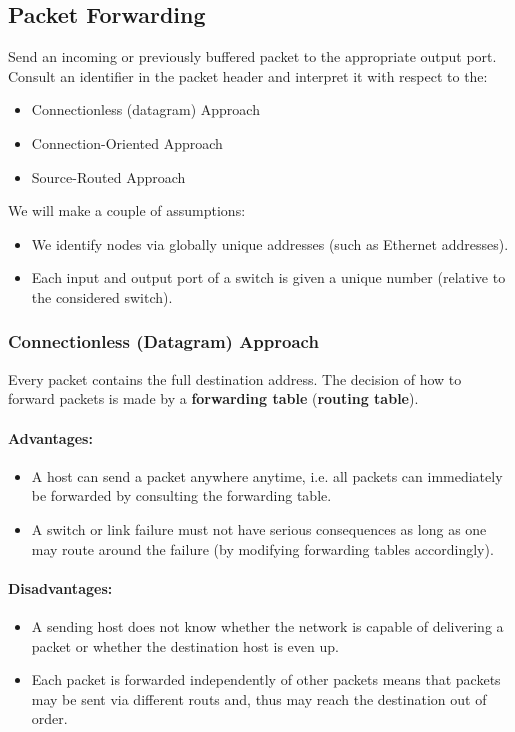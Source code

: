 \documentclass{article}%
\begin{document}
\subsection{Packet Forwarding}
\label{sec:org8fb40f2}
Send an incoming or previously buffered packet to the appropriate output port.
Consult an identifier in the packet header and interpret it with respect to the:
\begin{itemize}
\item Connectionless (datagram) Approach
\item Connection-Oriented Approach
\item Source-Routed Approach
\end{itemize}
We will make a couple of assumptions:
\begin{itemize}
\item We identify nodes via globally unique addresses (such as Ethernet addresses).
\item Each input and output port of a switch is given a unique number (relative to the considered switch).
\end{itemize}

\subsubsection{Connectionless (Datagram) Approach}
\label{sec:org5f9c020}
Every packet contains the full destination address.
The decision of how to forward packets is made by a \textbf{forwarding table} (\textbf{routing table}).
\paragraph{Advantages:}
\label{sec:org00c1d97}
\begin{itemize}
\item A host can send a packet anywhere anytime, i.e. all packets can immediately be forwarded by consulting the forwarding table.
\item A switch or link failure must not have serious consequences as long as one may route around the failure (by modifying forwarding tables accordingly).
\end{itemize}
\paragraph{Disadvantages:}
\label{sec:org6fa6423}
\begin{itemize}
\item A sending host does not know whether the network is capable of delivering a packet or whether the destination host is even up.
\item Each packet is forwarded independently of other packets means that packets may be sent via different routs and, thus may reach the destination out of order.
\end{itemize}
\end{document}
